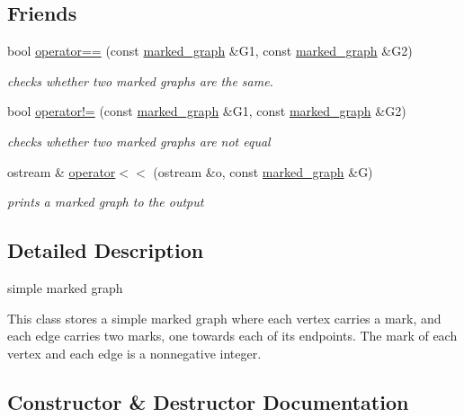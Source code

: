 \subsection*{Friends}
\begin{DoxyCompactItemize}
\item 
bool \hyperlink{classmarked__graph_a1718b82e881f8c37552018df1f83f82c}{operator==} (const \hyperlink{classmarked__graph}{marked\+\_\+graph} \&G1, const \hyperlink{classmarked__graph}{marked\+\_\+graph} \&G2)
\begin{DoxyCompactList}\small\item\em checks whether two marked graphs are the same. \end{DoxyCompactList}\item 
bool \hyperlink{classmarked__graph_a52ab641f19231908b18f8661bad17493}{operator!=} (const \hyperlink{classmarked__graph}{marked\+\_\+graph} \&G1, const \hyperlink{classmarked__graph}{marked\+\_\+graph} \&G2)
\begin{DoxyCompactList}\small\item\em checks whether two marked graphs are not equal \end{DoxyCompactList}\item 
ostream \& \hyperlink{classmarked__graph_a4f98d2df29f50f6da1365a14fd80d764}{operator$<$$<$} (ostream \&o, const \hyperlink{classmarked__graph}{marked\+\_\+graph} \&G)
\begin{DoxyCompactList}\small\item\em prints a marked graph to the output \end{DoxyCompactList}\end{DoxyCompactItemize}


\subsection{Detailed Description}
simple marked graph 

This class stores a simple marked graph where each vertex carries a mark, and each edge carries two marks, one towards each of its endpoints. The mark of each vertex and each edge is a nonnegative integer. 

\subsection{Constructor \& Destructor Documentation}
\mbox{\label{classmarked__graph_acff011a677859b66513c42c4f7e8d531}} 
